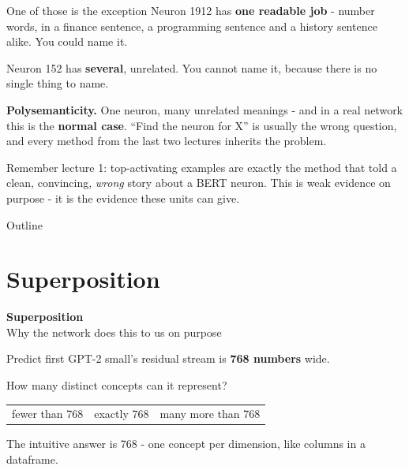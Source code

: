 \documentclass[aspectratio=169]{beamer}
\newcommand{\keybox}[1]{%
  \begin{tcolorbox}[colback=armblue!8, colframe=armblue, boxrule=0.6pt, arc=2pt]
  #1
  \end{tcolorbox}}
\newcommand{\sectiontransition}[2]{%
  \begin{frame}[plain]
    \vfill
    \begin{center}
      {\Huge\bfseries\color{popblue} #1}\\[1.1em]
      {\large #2}
    \end{center}
    \vfill
  \end{frame}}
\begin{document}
\begin{frame}{One of those is the exception}
  \vspace{0.7em}
  Neuron 1912 has \textbf{one readable job} - number words, in a finance sentence, a programming
  sentence and a history sentence alike. You could name it.

  \vspace{0.5em}
  Neuron 152 has \textbf{several}, unrelated. You cannot name it, because there is no single
  thing to name.

  \vspace{0.8em}
  \keybox{\textbf{Polysemanticity.} One neuron, many unrelated meanings - and in a real network
  this is the \textbf{normal case}. ``Find the neuron for X'' is usually the wrong question, and
  every method from the last two lectures inherits the problem.}

  \vspace{0.6em}
  {\footnotesize Remember lecture 1: top-activating examples are exactly the method that told a
  clean, convincing, \emph{wrong} story about a BERT neuron. This is weak evidence on purpose -
  it is the evidence these units can give.}
\end{frame}

\begin{frame}{Outline}
  \tableofcontents
\end{frame}

\section{Superposition}
\sectiontransition{Superposition}{Why the network does this to us on purpose}

\begin{frame}{Predict first}
  \vspace{1.0em}
  GPT-2 small's residual stream is \textbf{768 numbers} wide.

  \vspace{1.3em}
  \begin{center}
    {\large How many distinct concepts can it represent?}
  \end{center}

  \vspace{1.3em}
  \begin{center}
  \small
  \begin{tabular}{@{}ccc@{}}
    fewer than 768 & exactly 768 & many more than 768\\
  \end{tabular}
  \end{center}

  \vspace{1.2em}
  \begin{center}
    {\footnotesize The intuitive answer is 768 - one concept per dimension, like columns in a
    dataframe.}
  \end{center}
\end{frame}
\end{document}
